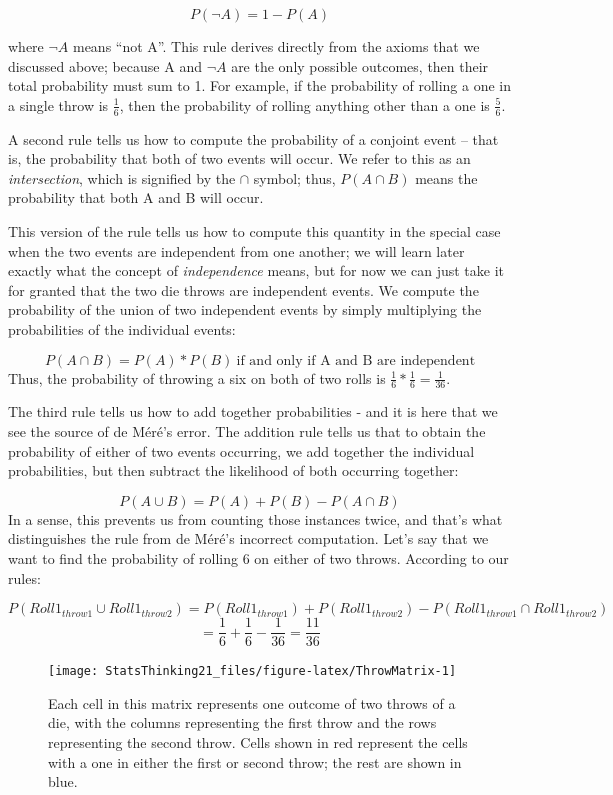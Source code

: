 \documentclass[12pt,]{book}
\theoremstyle{definition}
\theoremstyle{definition}
\theoremstyle{definition}
\theoremstyle{remark}
\begin{document}
\[
P(\neg A) = 1 - P(A)
\]

where \(\neg A\) means ``not A''. This rule derives directly from the axioms that we discussed above; because A and \(\neg A\) are the only possible outcomes, then their total probability must sum to 1. For example, if the probability of rolling a one in a single throw is \(\frac{1}{6}\), then the probability of rolling anything other than a one is \(\frac{5}{6}\).

A second rule tells us how to compute the probability of a conjoint event -- that is, the probability that both of two events will occur. We refer to this as an \emph{intersection}, which is signified by the \(\cap\) symbol; thus, \(P(A \cap B)\) means the probability that both A and B will occur.

This version of the rule tells us how to compute this quantity in the special case when the two events are independent from one another; we will learn later exactly what the concept of \emph{independence} means, but for now we can just take it for granted that the two die throws are independent events. We compute the probability of the union of two independent events by simply multiplying the probabilities of the individual events:

\[
P(A \cap B) = P(A) * P(B)\ \text{if and only if A and B are independent}
\]
Thus, the probability of throwing a six on both of two rolls is \(\frac{1}{6}*\frac{1}{6}=\frac{1}{36}\).

The third rule tells us how to add together probabilities - and it is here that we see the source of de Méré's error. The addition rule tells us that to obtain the probability of either of two events occurring, we add together the individual probabilities, but then subtract the likelihood of both occurring together:

\[
P(A \cup B) = P(A) + P(B) - P(A \cap B)
\]
In a sense, this prevents us from counting those instances twice, and that's what distinguishes the rule from de Méré's incorrect computation. Let's say that we want to find the probability of rolling 6 on either of two throws. According to our rules:

\[
P(Roll1_{throw1} \cup Roll1_{throw2}) = P(Roll1_{throw1}) + P(Roll1_{throw2}) - P(Roll1_{throw1} \cap Roll1_{throw2}) 
\]
\[
= \frac{1}{6} + \frac{1}{6} - \frac{1}{36} = \frac{11}{36}
\]

\begin{figure}
\texttt{[image: StatsThinking21\_files/figure-latex/ThrowMatrix-1]} \caption{Each cell in this matrix represents one outcome of two throws of a die, with the columns representing the first throw and the rows representing the second throw. Cells shown in red represent the cells with a one in either the first or second throw; the rest are shown in blue.}\label{fig:ThrowMatrix}
\end{figure}
\end{document}
